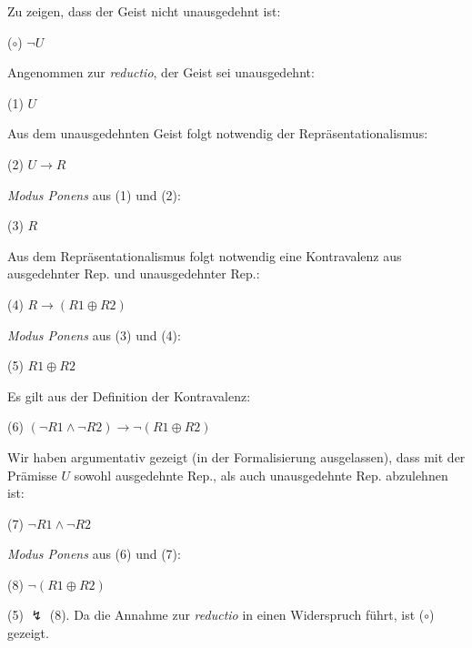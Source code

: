 \documentclass[a4paper, 12pt]{article}
\begin{document}
\vspace{14pt}

\noindent Zu zeigen, dass der Geist nicht unausgedehnt ist:

\vspace{4pt}
($\circ$) \hspace*{1em} $\neg U$

\vspace{4pt}
\noindent Angenommen zur \emph{reductio}, der Geist sei unausgedehnt:

\vspace{4pt}
(1) \hspace*{1em} $U$

\vspace{4pt}
\noindent Aus dem unausgedehnten Geist folgt notwendig der Repräsentationalismus:  

\vspace{4pt}
(2) \hspace*{1em}  $U \rightarrow R$

\vspace{4pt}
\noindent \emph{Modus Ponens} aus (1) und (2):

\vspace{4pt}
(3) \hspace*{1em} $R$

\vspace{4pt}
\noindent Aus dem Repräsentationalismus folgt notwendig eine Kontravalenz aus ausgedehnter Rep. und unausgedehnter Rep.:

\vspace{4pt}
(4) \hspace*{1em} $R \rightarrow (R1 \oplus R2)$


\vspace{4pt}
\noindent \emph{Modus Ponens} aus (3) und (4):

\vspace{4pt}
(5) \hspace*{1em} $R1 \oplus R2$

\vspace{4pt}

\noindent Es gilt aus der Definition der Kontravalenz: 

\vspace{4pt}
(6) \hspace*{1em}  $(\neg R1 \land \neg R2)  \rightarrow \neg (R1 \oplus R2)$
\vspace{4pt}

\noindent Wir haben argumentativ gezeigt (in der Formalisierung ausgelassen), dass mit der Prämisse $U$ sowohl ausgedehnte Rep., als auch unausgedehnte Rep. abzulehnen ist: 

\vspace{4pt}
(7) \hspace*{1em}  $\neg R1 \land \neg R2$

\vspace{4pt}
\noindent \emph{Modus Ponens} aus (6) und (7):

\vspace{4pt}
(8) \hspace*{1em} $\neg (R1 \oplus R2)$


\vspace{14pt}
\noindent (5) $\lightning$ (8).  Da die Annahme zur \emph{reductio} in einen Widerspruch führt, ist ($\circ$) gezeigt.
\end{document}
